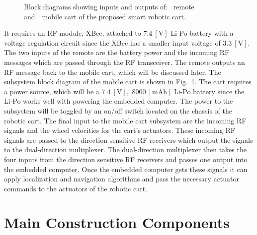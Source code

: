 \documentclass[conference]{IEEEtran}
\def\smgrid{0.5}
\begin{document}
\begin{figure}[htbp]
\begin{subfigure}[b]{0.9\linewidth}
    \caption{}
    \label{fig:mobile_block_diag}
  \end{subfigure}
  \caption{Block diagrams showing inputs and outputs of:~ remote and~~mobile cart of the proposed smart robotic cart.}
  \label{fig:blockDiagramRemoteMobileCart}
\end{figure}
%
It requires an RF module, XBee, attached to $7.4~[\si{\volt}]$ Li-Po battery
with a voltage regulation circuit since the XBee has a smaller input voltage of
$3.3~[\si{\volt}].$ The two inputs of the remote are the battery power and the
incoming RF messages which are passed through the RF transceiver. The remote
outputs an RF message back to the mobile cart, which will be discussed
later. The subsystem block diagram of the mobile cart is shown in
Fig.~\ref{fig:mobile_block_diag}. The cart requires a power source, which will
be a $7.4~[\si{\volt}],$ $8000~[\si{\milli\ampere\hour}]$ Li-Po battery since the Li-Po works well with powering the
embedded computer. The power to the subsystem will be toggled
by an on/off switch located on the chassis of the robotic cart. The final input
to the mobile cart subsystem are the incoming RF signals and the wheel velocities for the cart's actuators. These incoming RF
signals are passed to the direction sensitive RF receivers which output the
signals to the dual-direction multiplexer. The dual-direction multiplexer then
takes the four inputs from the direction sensitive RF receivers and passes one
output into the embedded computer. Once the embedded computer gets these signals
it can apply localization and navigation algorithms and pass the necessary actuator commands to the actuators of the robotic cart. 



\section{Main Construction Components}
\label{sec:mainConstructionComponents}
\end{document}
